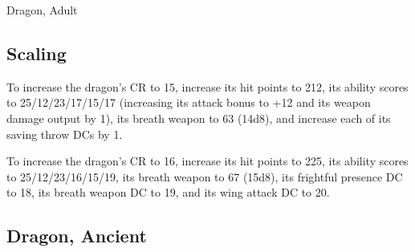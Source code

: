 \begin{DndMonster}[float*=b,width=\textwidth + 8pt]{Dragon, Adult}
\begin{multicols}{2}
\subsection{Scaling}
To increase the dragon's CR to 15, increase its hit points to 212, its ability scores to 25/12/23/17/15/17 (increasing its attack bonus to +12 and its weapon damage output by 1), its breath weapon to 63 (14d8), and increase each of its saving throw DCs by 1.

To increase the dragon's CR to 16, increase its hit points to 225, its ability scores to 25/12/23/16/15/19, its breath weapon to 67 (15d8), its frightful presence DC to 18, its breath weapon DC to 19, and its wing attack DC to 20.
\end{multicols}
\end{DndMonster}
\subsection{Dragon, Ancient}
